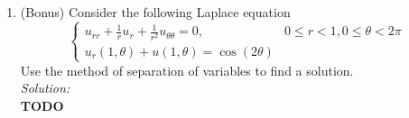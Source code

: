 \documentclass[10pt]{amsart}
\theoremstyle{nonumberplain}
\begin{document}
\begin{enumerate}[label={\bf {\arabic*}:}]
\newpage


\item (Bonus) Consider the following Laplace equation
$$
\begin{cases}
u_{rr} + \frac 1 ru_{r} + \frac 1 {r^2} u_{\theta\theta} = 0, & 0 \leq r < 1, 0 \leq \theta < 2\pi \\
u_r(1, \theta) + u(1, \theta) = \cos(2 \theta)
\end{cases}
$$
Use the method of separation of variables to find a solution. \\

\noindent
\textit{Solution:} \\
\textbf{TODO}

\newpage

\end{enumerate}
\end{document}
